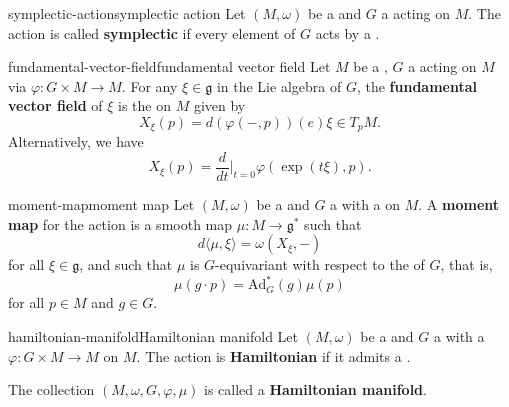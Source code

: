 \begin{topic}{symplectic-action}{symplectic action}
    Let $(M, \omega)$ be a  and $G$ a  acting on $M$. The action is called \textbf{symplectic} if every element of $G$ acts by a .
\end{topic}

\begin{topic}{fundamental-vector-field}{fundamental vector field}
    Let $M$ be a , $G$ a  acting on $M$ via $\varphi : G \times M \to M$. For any $\xi \in \mathfrak{g}$ in the Lie algebra of $G$, the \textbf{fundamental vector field} of $\xi$ is the  on $M$ given by
    \[ X_\xi(p) = d(\varphi(-, p))(e) \xi \in T_p M . \]
    Alternatively, we have
    \[ X_\xi(p) = \frac{d}{d t}\Big|_{t = 0} \varphi(\exp(t \xi), p) . \]
\end{topic}

\begin{topic}{moment-map}{moment map}
    Let $(M, \omega)$ be a  and $G$ a  with a  on $M$. A \textbf{moment map} for the action is a smooth map $\mu : M \to \mathfrak{g}^*$ such that
    \[ d \langle \mu, \xi \rangle = \omega(X_\xi, -) \]
    for all $\xi \in \mathfrak{g}$, and such that $\mu$ is $G$-equivariant with respect to the  of $G$, that is,
    \[ \mu(g \cdot p) = \text{Ad}_G^* (g) \mu(p) \]
    for all $p \in M$ and $g \in G$.
\end{topic}

\begin{topic}{hamiltonian-manifold}{Hamiltonian manifold}
    Let $(M, \omega)$ be a  and $G$ a  with a  $\varphi : G \times M \to M$ on $M$. The action is \textbf{Hamiltonian} if it admits a .
    
    The collection $(M, \omega, G, \varphi, \mu)$ is called a \textbf{Hamiltonian manifold}.
\end{topic}

